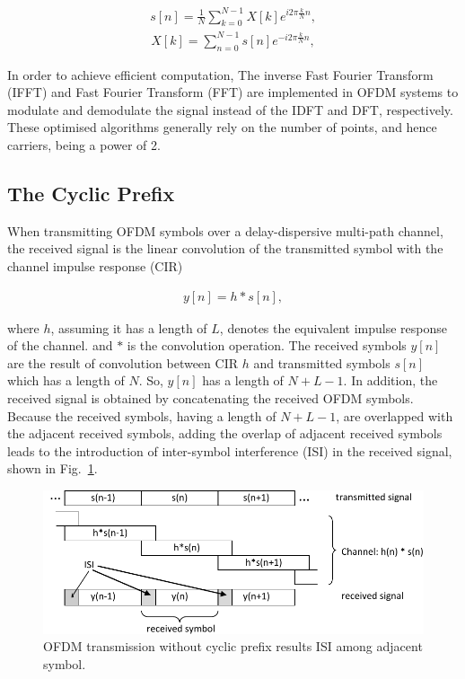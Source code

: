 \begin{eqnarray}
\label{equ:sampledOFDMsignal}
s[n] = \frac{1}{N}\sum_{k=0}^{N-1} X[k] e^{i2\pi\frac{k}{N}n},
\end{eqnarray}
\begin{eqnarray}
\label{equ:sampledOFDMsignal}
X[k] = \sum_{n=0}^{N-1} s[n] e^{-i2\pi\frac{k}{N}n},
\end{eqnarray}

In order to achieve efficient computation, The inverse Fast Fourier Transform (IFFT) and Fast Fourier Transform (FFT) are implemented in OFDM systems to modulate and demodulate the signal instead of the IDFT and DFT, respectively. These optimised algorithms generally rely on the number of points, and hence carriers, being a power of 2.

\subsection{The Cyclic Prefix}

When transmitting OFDM symbols over a delay-dispersive multi-path channel, the received signal is the linear convolution of the transmitted symbol with the channel impulse response (CIR)

\begin{eqnarray}
\label{equ:sampledOFDMsignal}
y[n] = h*s[n],
\end{eqnarray}

where $h$, assuming it has a length of $L$, denotes the equivalent impulse response of the channel. and $*$ is the convolution operation.
The received symbols $y[n]$ are the result of convolution between CIR $h$ and transmitted symbols $s[n]$ which has a length of $N$.
So, $y[n]$ has a length of $N+L-1$.
In addition, the received signal is obtained by concatenating the received OFDM symbols.
Because the received symbols, having a length of $N+L-1$, are overlapped with the adjacent received symbols, adding the overlap of adjacent received symbols leads to the introduction of inter-symbol interference (ISI) in the received signal, shown in Fig.~\ref{fig:CIR-noCP}.


\begin{figure}
	\centerline{\includegraphics [width=0.8\columnwidth] {Figures/CIR_noCP.pdf} }
	\caption{OFDM transmission without cyclic prefix results ISI among adjacent symbol.}
	\label{fig:CIR-noCP}
\end{figure}

